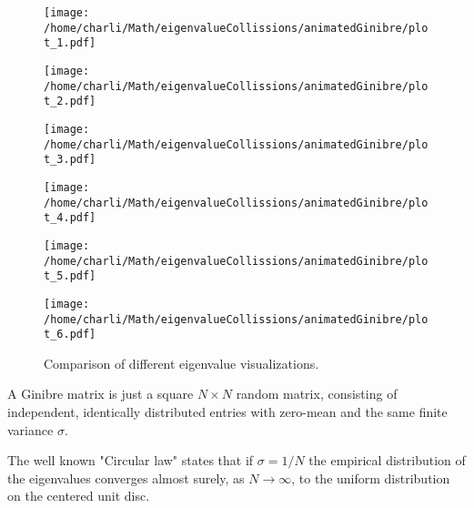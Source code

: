\documentclass{article}
\begin{document}
	\begin{figure}[htbp]
    \centering
    \begin{minipage}[b]{0.48\textwidth}
        \centering
        \texttt{[image: /home/charli/Math/eigenvalueCollissions/animatedGinibre/plot\_1.pdf]}
    \end{minipage}
    \hfill
    \begin{minipage}[b]{0.48\textwidth}
        \centering
        \texttt{[image: /home/charli/Math/eigenvalueCollissions/animatedGinibre/plot\_2.pdf]}
    \end{minipage}

    \vspace{0.5cm}
    \begin{minipage}[b]{0.48\textwidth}
        \centering
        \texttt{[image: /home/charli/Math/eigenvalueCollissions/animatedGinibre/plot\_3.pdf]}
    \end{minipage}
    \hfill
    \begin{minipage}[b]{0.48\textwidth}
        \centering
        \texttt{[image: /home/charli/Math/eigenvalueCollissions/animatedGinibre/plot\_4.pdf]}
    \end{minipage}

    \vspace{0.5cm}
    \begin{minipage}[b]{0.48\textwidth}
        \centering
        \texttt{[image: /home/charli/Math/eigenvalueCollissions/animatedGinibre/plot\_5.pdf]}
    \end{minipage}
    \hfill
    \begin{minipage}[b]{0.48\textwidth}
        \centering
        \texttt{[image: /home/charli/Math/eigenvalueCollissions/animatedGinibre/plot\_6.pdf]}
    \end{minipage}
    
    \caption{Comparison of different eigenvalue visualizations.}
    \label{fig:comparison}
	\end{figure}

	A Ginibre matrix is just a square $N\times N$ random matrix, 
	consisting of independent, identically distributed entries 
	with zero-mean and the same finite variance $\sigma$. 
	
	The well known "Circular law" states that if $\sigma = 1/N$ the 
	empirical distribution of the eigenvalues converges almost surely,
	as $N\to \infty$, to the uniform distribution on the centered unit disc.
	
\end{document}

